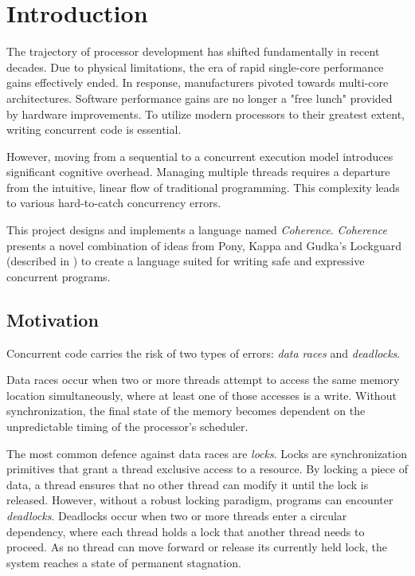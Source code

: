 \chapter{Introduction}
The trajectory of processor development has shifted fundamentally in recent decades. Due to physical limitations, the era of rapid single-core performance gains effectively ended. In response, manufacturers pivoted towards multi-core architectures. Software performance gains are no longer a "free lunch" provided by hardware improvements\cite{free_lunch}. To utilize modern processors to their greatest extent, writing concurrent code is essential.

However, moving from a sequential to a concurrent execution model introduces significant cognitive overhead. Managing multiple threads requires a departure from the intuitive, linear flow of traditional programming. This complexity leads to various hard-to-catch concurrency errors.

This project designs and implements a language named \textit{Coherence}. \textit{Coherence} presents a novel combination of ideas from Pony, Kappa and Gudka's Lockguard (described in ) to create a language suited for writing safe and expressive concurrent programs.

\section{Motivation} \label{sec:intro_motivation}
Concurrent code carries the risk of two types of errors: \textit{data races} and \textit{deadlocks}.

Data races occur when two or more threads attempt to access the same memory location simultaneously, where at least one of those accesses is a write. Without synchronization, the final state of the memory becomes dependent on the unpredictable timing of the processor's scheduler. 

The most common defence against data races are \textit{locks}. Locks are synchronization primitives that grant a thread exclusive access to a resource. By locking a piece of data, a thread ensures that no other thread can modify it until the lock is released. However, without a robust locking paradigm, programs can encounter \textit{deadlocks}. Deadlocks occur when two or more threads enter a circular dependency, where each thread holds a lock that another thread needs to proceed. As no thread can move forward or release its currently held lock, the system reaches a state of permanent stagnation.

